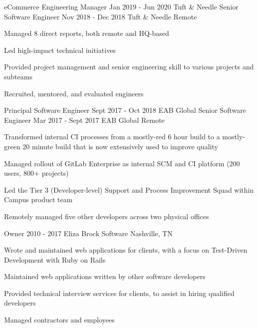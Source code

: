 \begin{cventries}
  \doublecventry
  {eCommerce Engineering Manager}
  {Jan 2019 - Jun 2020}
  {Tuft \& Needle}
  {Senior Software Engineer}
  {Nov 2018 - Dec 2018}
  {Tuft \& Needle}
  {}
  {Remote}
  {
    \begin{cvitems}
      \item Managed 8 direct reports, both remote and HQ-based
      \item Led high-impact technical initiatives
      \item Provided project management and senior engineering skill to various projects and subteams
      \item Recruited, mentored, and evaluated engineers
    \end{cvitems}
    \cvtags{
      \tagRuby
      \tagRails
      \tagPostgreSQL
      \tagAccessibility
      \tagCIShort
      \tagTDDShort
      \tagECommerce
      \tagPeopleManagement
      \tagProjectManagement
    }
  }

  \doublecventry
  {Principal Software Engineer}
  {Sept 2017 - Oct 2018}
  {EAB Global}
  {Senior Software Engineer}
  {Mar 2017 - Sept 2017}
  {EAB Global}
  {}
  {Remote}
  {
    \begin{cvitems}
      \item Transformed internal CI processes from a mostly-red 6 hour build to a mostly-green 20 minute build that is now extensively used to improve quality
      \item Managed rollout of GitLab Enterprise as internal SCM and CI platform (200 users, 800+ projects)
      \item Led the Tier 3 (Developer-level) Support and Process Improvement Squad within Campus product team
      \item Remotely managed five other developers across two physical offices
    \end{cvitems}
    \cvtags{
      \tagRuby
      \tagRails
      \tagMySQL
      \tagCIShort
      \tagTDDShort
      \tagPeopleManagement
      \tagProjectManagement
    }
  }

  \cventry
  {Owner}
  {2010 - 2017}
  {Eliza Brock Software}
  {Nashville, TN}
  {
    \begin{cvitems}
      \item Wrote and maintained web applications for clients, with a focus on Test-Driven \mbox{Development} with Ruby on Rails
      \item Maintained web applications written by other software developers
      \item Provided technical interview services for clients, to assist in hiring qualified developers
      \item Managed contractors and employees
    \end{cvitems}
    \cvtags{
      \tagRuby
      \tagHAML
      \tagJavaScript
      \tagSASS
      \tagRails
      \tagPostgreSQL
      \tagCIShort
      \tagTDDShort
      \tagPairProgramming
      \tagECommerce
      \tagPeopleManagement
      \tagProjectManagement
      \tagBalsamiq
      \tagPerl
      \tagPHP
    }
  }


\end{cventries}
